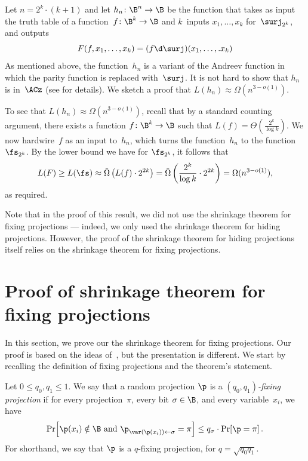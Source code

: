 \documentclass{toc}
\begin{document}
Let $n=2^{k}\cdot(k+1)$ and let $h_{n}\colon\B^{n}\to\B$ be the function
that takes as input the truth table of a function~$f\colon\B^{k}\to\B$
and $k$~inputs $x_{1},\ldots,x_{k}$ for~$\surj_{2^{k}}$, and
outputs
\[
F(f,x_{1},\ldots,x_{k})=(f\d\surj)(x_{1},\ldots,.x_{k})
\]
As mentioned above, the function~$h_{n}$ is a variant of the Andreev
function in which the parity function is replaced with~$\surj$.
It is not hard to show that $h_{n}$ is in~$\ACz$ (see 
for details). We sketch a proof that $L(h_{n})\approx\Omega(n^{3-o(1)})$.

To see that $L(h_{n})\approx\Omega(n^{3-o(1)})$, recall that by a
standard counting argument, there exists a function $f\colon\B^{k}\to\B$
such that $L(f)=\Theta\left(\frac{2^{k}}{\log k}\right)$. We now
hardwire~$f$ as an input to~$h_{n}$, which turns the function~$h_{n}$
to the function~$\fs_{2^{k}}$. By the lower bound we have for $\fs_{2^{k}}$,
it follows that
\[
L(F)\ge L(\fs)\approx\tilde{\Omega}\left(L(f)\cdot2^{2k}\right)=\tilde{\Omega}\left(\frac{2^{k}}{\log k}\cdot2^{2k}\right)=\Omega(n^{3-o(1)}),
\]
as required.
\begin{remark}
Note that in the proof of this result, we did not use the shrinkage
theorem for fixing projections --- indeed, we only used the shrinkage
theorem for hiding projections. However, the proof of the shrinkage
theorem for hiding projections itself relies on the shrinkage theorem for fixing
projections.
\end{remark}


\section{\label{sec:shrinkage-fixing}Proof of shrinkage theorem for fixing
projections}

In this section, we prove our the shrinkage theorem for fixing projections.
Our proof is based on the ideas of~\cite{H98}, but the presentation
is different. We start by recalling the definition of fixing projections
and the theorem's statement.
\begin{repdefinition}{}
Let $0\le q_{0},q_{1}\le1$. We say that a random projection $\p$
is a \emph{$(q_{0},q_{1})$-fixing projection} if for every projection~$\pi$,
every bit $\sigma\in\B$, and every variable~$x_{i}$, we have
\[
\Pr\!\left[\p(x_{i})\notin\B\text{ and }\p_{\var(\p(x_{i}))\gets\sigma}=\pi\right]\le q_{\sigma}\cdot\Pr\!\left[\p=\pi\right].
\]
For shorthand, we say that $\p$ is a $q$-fixing projection, for
$q=\sqrt{q_{0}q_{1}}$. 
\end{repdefinition}
\end{document}
